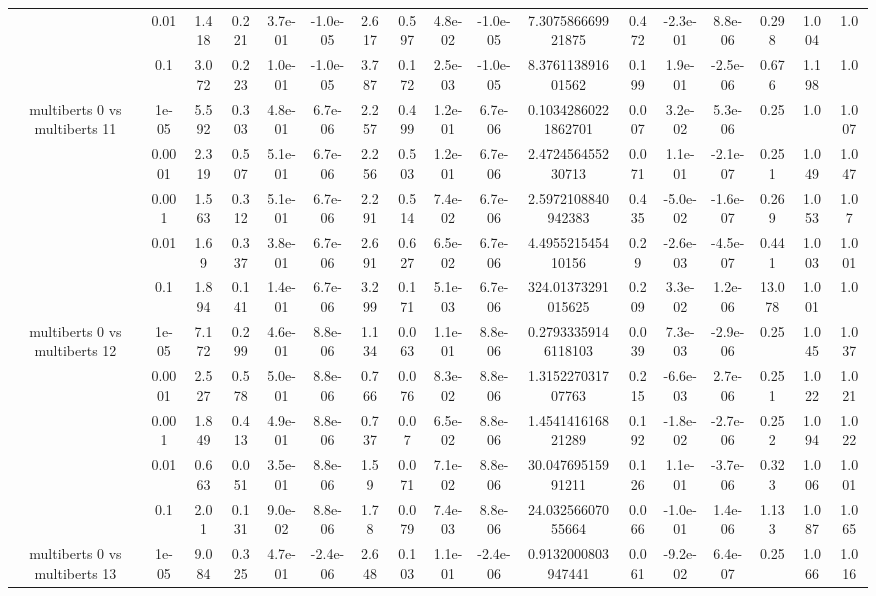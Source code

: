 \begin{tabular}{|c|c|c|c|c|c|c|c|c|c|c|c|c|c|c|c|c|}
 & 0.01 & 1.418 & 0.221 & 3.7e-01 & -1.0e-05 & 2.617 & 0.597 & 4.8e-02 & -1.0e-05 & 7.307586669921875 & 0.472 & -2.3e-01 & 8.8e-06 & 0.298 & 1.004 & 1.0 \\
 & 0.1 & 3.072 & 0.223 & 1.0e-01 & -1.0e-05 & 3.787 & 0.172 & 2.5e-03 & -1.0e-05 & 8.376113891601562 & 0.199 & 1.9e-01 & -2.5e-06 & 0.676 & 1.198 & 1.0 \\
\hline
\multirow{5}{*}{multiberts 0 vs multiberts 11} & 1e-05 & 5.592 & 0.303 & 4.8e-01 & 6.7e-06 & 2.257 & 0.499 & 1.2e-01 & 6.7e-06 & 0.10342860221862701 & 0.007 & 3.2e-02 & 5.3e-06 & 0.25 & 1.0 & 1.007 \\
 & 0.0001 & 2.319 & 0.507 & 5.1e-01 & 6.7e-06 & 2.256 & 0.503 & 1.2e-01 & 6.7e-06 & 2.472456455230713 & 0.071 & 1.1e-01 & -2.1e-07 & 0.251 & 1.049 & 1.047 \\
 & 0.001 & 1.563 & 0.312 & 5.1e-01 & 6.7e-06 & 2.291 & 0.514 & 7.4e-02 & 6.7e-06 & 2.5972108840942383 & 0.435 & -5.0e-02 & -1.6e-07 & 0.269 & 1.053 & 1.07 \\
 & 0.01 & 1.69 & 0.337 & 3.8e-01 & 6.7e-06 & 2.691 & 0.627 & 6.5e-02 & 6.7e-06 & 4.495521545410156 & 0.29 & -2.6e-03 & -4.5e-07 & 0.441 & 1.003 & 1.001 \\
 & 0.1 & 1.894 & 0.141 & 1.4e-01 & 6.7e-06 & 3.299 & 0.171 & 5.1e-03 & 6.7e-06 & 324.01373291015625 & 0.209 & 3.3e-02 & 1.2e-06 & 13.078 & 1.001 & 1.0 \\
\hline
\multirow{5}{*}{multiberts 0 vs multiberts 12} & 1e-05 & 7.172 & 0.299 & 4.6e-01 & 8.8e-06 & 1.134 & 0.063 & 1.1e-01 & 8.8e-06 & 0.27933359146118103 & 0.039 & 7.3e-03 & -2.9e-06 & 0.25 & 1.045 & 1.037 \\
 & 0.0001 & 2.527 & 0.578 & 5.0e-01 & 8.8e-06 & 0.766 & 0.076 & 8.3e-02 & 8.8e-06 & 1.315227031707763 & 0.215 & -6.6e-03 & 2.7e-06 & 0.251 & 1.022 & 1.021 \\
 & 0.001 & 1.849 & 0.413 & 4.9e-01 & 8.8e-06 & 0.737 & 0.07 & 6.5e-02 & 8.8e-06 & 1.454141616821289 & 0.192 & -1.8e-02 & -2.7e-06 & 0.252 & 1.094 & 1.022 \\
 & 0.01 & 0.663 & 0.051 & 3.5e-01 & 8.8e-06 & 1.59 & 0.071 & 7.1e-02 & 8.8e-06 & 30.04769515991211 & 0.126 & 1.1e-01 & -3.7e-06 & 0.323 & 1.006 & 1.001 \\
 & 0.1 & 2.01 & 0.131 & 9.0e-02 & 8.8e-06 & 1.78 & 0.079 & 7.4e-03 & 8.8e-06 & 24.03256607055664 & 0.066 & -1.0e-01 & 1.4e-06 & 1.133 & 1.087 & 1.065 \\
\hline
\multirow{5}{*}{multiberts 0 vs multiberts 13} & 1e-05 & 9.084 & 0.325 & 4.7e-01 & -2.4e-06 & 2.648 & 0.103 & 1.1e-01 & -2.4e-06 & 0.9132000803947441 & 0.061 & -9.2e-02 & 6.4e-07 & 0.25 & 1.066 & 1.016 \\

\end{tabular}
